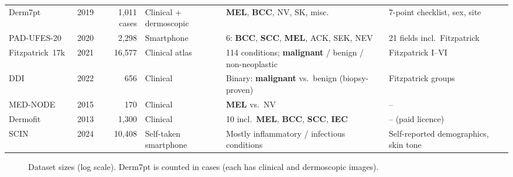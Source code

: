 \documentclass[10pt,a4paper]{article}
\begin{document}
{\begin{longtable}{@{}L{2.2cm} c r L{2.0cm} L{4.2cm} L{3.3cm}@{}}
Derm7pt~\cite{kawahara2019derm7pt} & 2019 & 1{,}011 cases & Clinical + dermoscopic & \textbf{MEL}, \textbf{BCC}, NV, SK, misc. & 7-point checklist, sex, site \\
PAD-UFES-20~\cite{pacheco2020padufes20} & 2020 & 2{,}298 & Smartphone & 6: \textbf{BCC}, \textbf{SCC}, \textbf{MEL}, ACK, SEK, NEV & 21 fields incl.\ Fitzpatrick \\
Fitzpatrick~17k~\cite{groh2021fitzpatrick17k} & 2021 & 16{,}577 & Clinical atlas & 114 conditions; \textbf{malignant} / benign / non-neoplastic & Fitzpatrick I--VI \\
DDI~\cite{daneshjou2022ddi} & 2022 & 656 & Clinical & Binary: \textbf{malignant} vs.\ benign (biopsy-proven) & Fitzpatrick groups \\
MED-NODE~\cite{giotis2015mednode} & 2015 & 170 & Clinical & \textbf{MEL} vs.\ NV & -- \\
Dermofit~\cite{ballerini2013dermofit} & 2013 & 1{,}300 & Clinical & 10 incl.\ \textbf{MEL}, \textbf{BCC}, \textbf{SCC}, \textbf{IEC} & -- (paid licence) \\
SCIN~\cite{ward2024scin} & 2024 & 10{,}408 & Self-taken smartphone & Mostly inflammatory / infectious conditions & Self-reported demographics, skin tone \\
\bottomrule
\end{longtable}
}

\begin{figure}[H]
\centering
{}
\caption{Dataset sizes (log scale). Derm7pt is counted in cases (each has clinical and dermoscopic images).}
\label{fig:sizes}
\end{figure}
\end{document}
